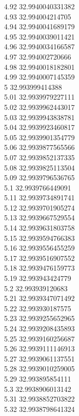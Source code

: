 {4.92	32.9940040331382\\
4.93	32.994004214705\\
4.94	32.9940041689179\\
4.95	32.9940039011421\\
4.96	32.9940034166587\\
4.97	32.994002720666\\
4.98	32.9940018182801\\
4.99	32.9940007145359\\
5	32.993999414388\\
5.01	32.9939979227111\\
5.02	32.9939962443017\\
5.03	32.9939943838781\\
5.04	32.9939923460817\\
5.05	32.9939901354779\\
5.06	32.9939877565566\\
5.07	32.9939852137335\\
5.08	32.9939825113504\\
5.09	32.9939796536765\\
5.1	32.9939766449091\\
5.11	32.9939734891741\\
5.12	32.9939701905274\\
5.13	32.9939667529554\\
5.14	32.9939631803758\\
5.15	32.9939594766383\\
5.16	32.9939556455259\\
5.17	32.9939516907552\\
5.18	32.9939476159773\\
5.19	32.993943424779\\
5.2	32.993939120683\\
5.21	32.9939347071492\\
5.22	32.993930187575\\
5.23	32.9939255652965\\
5.24	32.9939208435893\\
5.25	32.9939160256687\\
5.26	32.9939111146913\\
5.27	32.9939061137551\\
5.28	32.9939010259005\\
5.29	32.993895854111\\
5.3	32.9938906013142\\
5.31	32.9938852703822\\
5.32	32.9938798641324\\
}
